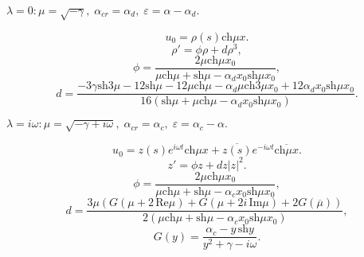 \documentclass[12pt]{extarticle}
\begin{document}
\newpage

$ \lambda = 0: \mu = \sqrt{-\gamma}, \; \alpha_{cr} = \alpha_d, \; \varepsilon=\alpha-\alpha_d. $

\begin{equation}
	u_0 = \rho(s) \mbox{ch} \mu x.
\end{equation}
\begin{equation}
	\rho' = \phi \rho + d \rho^3,
\end{equation}
$$ \phi = \frac{ 2 \mu \mbox{ch} \mu x_0 }{ \mu \mbox{ch} \mu +\mbox{sh} \mu - \alpha_d x_0 \mbox{sh} \mu x_0 }, $$
$$ d = \frac{ -3\gamma \mbox{sh} 3\mu - 12 \mbox{sh} \mu - 12 \mu \mbox{ch} \mu - \alpha_d \mu \mbox{ch} 3\mu x_0 + 12 \alpha_d x_0 \mbox{sh} \mu x_0 }{ 16( \mbox{sh} \mu + \mu \mbox{ch} \mu - \alpha_d x_0 \mbox{sh} \mu x_0 ) }. $$

$ \lambda = i \omega: \mu = \sqrt{-\gamma + i \omega}, \; \alpha_{cr} = \alpha_c, \; \varepsilon=\alpha_c-\alpha. $

\begin{equation}
	u_0 = z(s) e^{i \omega t} \mbox{ch} \mu x + \overline{z(s)} e^{-i \omega t} \overline{\mbox{ch} \mu x}.
\end{equation}
\begin{equation}
	z' = \phi z + d z |z|^2.
\end{equation}
$$ \phi = \frac{ 2 \mu \mbox{ch} \mu x_0 }{ \mu \mbox{ch} \mu +\mbox{sh} \mu - \alpha_c x_0 \mbox{sh} \mu x_0 }, $$
$$ d = \frac{ 3 \mu ( G(\mu + 2\,\mbox{Re}\mu) + G(\mu + 2i\,\mbox{Im}\mu) + 2G(\overline{\mu}) ) }{ 2 ( \mu \mbox{ch} \mu +\mbox{sh} \mu - \alpha_c x_0 \mbox{sh} \mu x_0 ) }, $$
$$ G(y) = \frac{ \alpha_c - y\,\mbox{sh} y }{ y^2 + \gamma - i\omega }. $$
\end{document}
